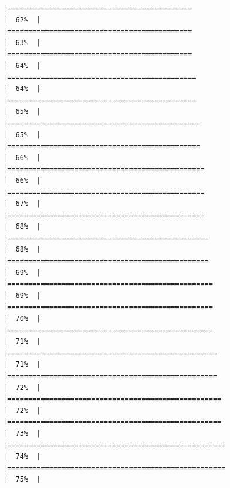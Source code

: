 \documentclass[
]{article}
\begin{document}
\begin{verbatim}
|============================================                          |  62%  |                                                                              |============================================                          |  63%  |                                                                              |============================================                          |  64%  |                                                                              |=============================================                         |  64%  |                                                                              |=============================================                         |  65%  |                                                                              |==============================================                        |  65%  |                                                                              |==============================================                        |  66%  |                                                                              |===============================================                       |  66%  |                                                                              |===============================================                       |  67%  |                                                                              |===============================================                       |  68%  |                                                                              |================================================                      |  68%  |                                                                              |================================================                      |  69%  |                                                                              |=================================================                     |  69%  |                                                                              |=================================================                     |  70%  |                                                                              |=================================================                     |  71%  |                                                                              |==================================================                    |  71%  |                                                                              |==================================================                    |  72%  |                                                                              |===================================================                   |  72%  |                                                                              |===================================================                   |  73%  |                                                                              |====================================================                  |  74%  |                                                                              |====================================================                  |  75%  |                                                                              
\end{verbatim}
\end{document}
